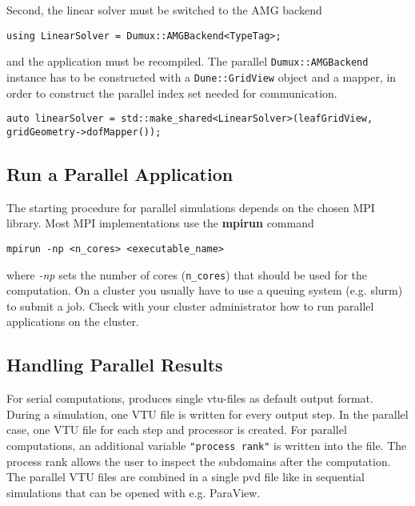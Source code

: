 Second, the linear solver must be switched to the AMG backend

\begin{lstlisting}[style=DumuxCode]
using LinearSolver = Dumux::AMGBackend<TypeTag>;
\end{lstlisting}

and the application must be recompiled. The parallel \texttt{Dumux::AMGBackend} instance has to be
constructed with a \texttt{Dune::GridView} object and a mapper, in order to construct the
parallel index set needed for communication.

\begin{lstlisting}[style=DumuxCode]
auto linearSolver = std::make_shared<LinearSolver>(leafGridView, gridGeometry->dofMapper());
\end{lstlisting}

\subsection{Run a Parallel Application}
The starting procedure for parallel simulations depends on the chosen MPI library.
Most MPI implementations use the \textbf{mpirun} command

\begin{lstlisting}[style=Bash]
mpirun -np <n_cores> <executable_name>
\end{lstlisting}

where \textit{-np} sets the number of cores (\texttt{n\_cores}) that should be used for the
computation. On a cluster you usually have to use a queuing system (e.g. slurm) to
submit a job. Check with your cluster administrator how to run parallel applications on the cluster.

\subsection{Handling Parallel Results}
For serial computations, \Dumux produces single vtu-files as default output format.
During a simulation, one VTU file is written for every output step.
In the parallel case, one VTU file for each step and processor is created.
For parallel computations, an additional variable \texttt{"process rank"} is written
into the file. The process rank allows the user to inspect the subdomains
after the computation. The parallel VTU files are combined in a single pvd file
like in sequential simulations that can be opened with e.g. ParaView.
